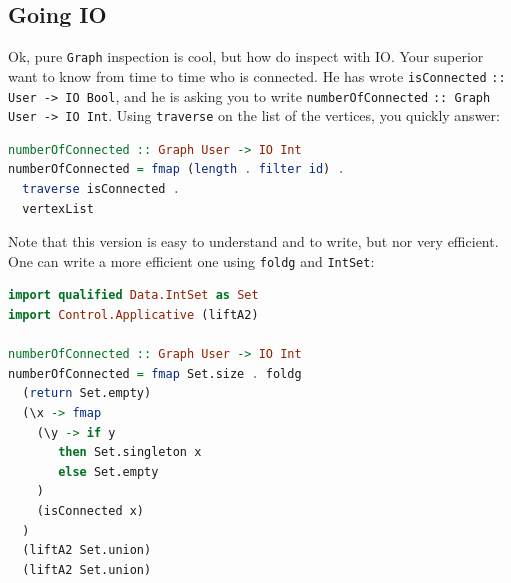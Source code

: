 \documentclass[10pt,a4paper]{article}
\begin{document}
\subsection{Going IO}
Ok, pure \verb|Graph| inspection is cool, but how do inspect with IO. Your superior want to know from time to time who is connected. He has wrote \verb|isConnected| \verb|:: User -> IO Bool|, and he is asking you to write \verb|numberOfConnected| \verb|:: Graph User -> IO Int|. Using \verb|traverse| on the list of the vertices, you quickly answer:
\begin{lstlisting}[language=Haskell, frame=single]
numberOfConnected :: Graph User -> IO Int
numberOfConnected = fmap (length . filter id) .
  traverse isConnected . 
  vertexList
\end{lstlisting}

Note that this version is easy to understand and to write, but nor very efficient. One can write a more efficient one using \verb|foldg| and \verb|IntSet|:
\begin{lstlisting}[language=Haskell, frame=single]
import qualified Data.IntSet as Set
import Control.Applicative (liftA2)

numberOfConnected :: Graph User -> IO Int
numberOfConnected = fmap Set.size . foldg
  (return Set.empty)
  (\x -> fmap
    (\y -> if y
       then Set.singleton x
       else Set.empty
    )
    (isConnected x)
  )
  (liftA2 Set.union)
  (liftA2 Set.union)
\end{lstlisting}
\end{document}
